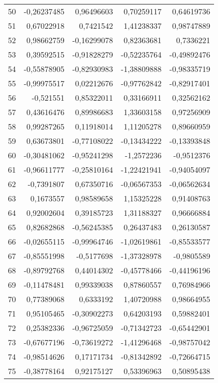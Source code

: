 \documentclass[12pt]{article}
\begin{document}
\begin{longtable}{lrrrr}
 50 & -0,26237485 & 0,96496603 & 0,70259117 & 0,64619736 \\
 51 & 0,67022918 &  0,7421542 & 1,41238337 & 0,98747889 \\
 52 & 0,98662759 & -0,16299078 & 0,82363681 &  0,7336221 \\
 53 & 0,39592515 & -0,91828279 & -0,52235764 & -0,49892476 \\
 54 & -0,55878905 & -0,82930983 & -1,38809888 & -0,98335719 \\
 55 & -0,99975517 & 0,02212676 & -0,97762842 & -0,82917401 \\
 56 &  -0,521551 & 0,85322011 & 0,33166911 & 0,32562162 \\
 57 & 0,43616476 & 0,89986683 & 1,33603158 & 0,97256909 \\
 58 & 0,99287265 & 0,11918014 & 1,11205278 & 0,89660959 \\
 59 & 0,63673801 & -0,77108022 & -0,13434222 & -0,13393848 \\
 60 & -0,30481062 & -0,95241298 & -1,2572236 & -0,9512376 \\
 61 & -0,96611777 & -0,25810164 & -1,22421941 & -0,94054097 \\
 62 & -0,7391807 & 0,67350716 & -0,06567353 & -0,06562634 \\
 63 &  0,1673557 & 0,98589658 & 1,15325228 & 0,91408763 \\
 64 & 0,92002604 & 0,39185723 & 1,31188327 & 0,96666884 \\
 65 & 0,82682868 & -0,56245385 & 0,26437483 & 0,26130587 \\
 66 & -0,02655115 & -0,99964746 & -1,02619861 & -0,85533577 \\
 67 & -0,85551998 & -0,5177698 & -1,37328978 & -0,9805589 \\
 68 & -0,89792768 & 0,44014302 & -0,45778466 & -0,44196196 \\
 69 & -0,11478481 & 0,99339038 & 0,87860557 & 0,76984966 \\
 70 & 0,77389068 &  0,6333192 & 1,40720988 & 0,98664955 \\
 71 & 0,95105465 & -0,30902273 & 0,64203193 & 0,59882401 \\
 72 & 0,25382336 & -0,96725059 & -0,71342723 & -0,65442901 \\
 73 & -0,67677196 & -0,73619272 & -1,41296468 & -0,98757042 \\
 74 & -0,98514626 & 0,17171734 & -0,81342892 & -0,72664715 \\
 75 & -0,38778164 & 0,92175127 & 0,53396963 & 0,50895438 \\

\end{longtable}
\end{document}
